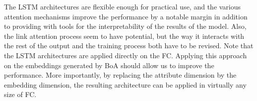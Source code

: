 The LSTM architectures are flexible enough for practical use, and the various attention mechanisms improve the performance by a notable margin in addition to providing with tools for the interpretability of the results of the model.
Also, the link attention process seem to have potential, but the way it interacts with the rest of the output and the training process both have to be revised.
%
Note that the LSTM architectures are applied directly on the FC.
Applying this approach on the embeddings generated by BoA should allow us to improve the performance.
More importantly, by replacing the attribute dimension by the embedding dimension, the resulting architecture can be applied in virtually any size of FC.
